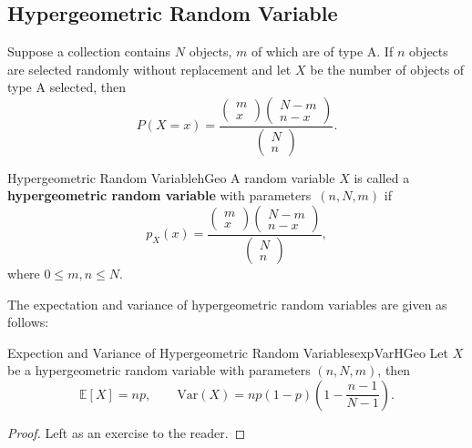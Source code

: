 \documentclass[math]{amznotes}
\theoremstyle{remark}
\newcommand{\0}{\mathbf{0}}
\newcommand{\1}{\mathbf{1}}
\begin{document}
\subsection{Hypergeometric Random Variable}
Suppose a collection contains $N$ objects, $m$ of which are of type A. If $n$ objects are selected randomly without replacement and let $X$ be the number of objects of type A selected, then 
\begin{equation*}
    P(X = x) = \frac{\begin{pmatrix}
        m \\
        x
    \end{pmatrix}\begin{pmatrix}
        N - m\\
        n - x
    \end{pmatrix}}{\begin{pmatrix}
        N \\
        n
    \end{pmatrix}}.
\end{equation*}
\begin{dfnbox}{Hypergeometric Random Variable}{hGeo}
    A random variable $X$ is called a {\color{red} \textbf{hypergeometric random variable}} with parameters~$(n, N, m)$ if
    \begin{equation*}
        p_X(x) = \frac{\begin{pmatrix}
            m \\
            x
        \end{pmatrix}\begin{pmatrix}
            N - m\\
            n - x
        \end{pmatrix}}{\begin{pmatrix}
            N \\
            n
        \end{pmatrix}},
    \end{equation*}
    where $0 \leq m, n \leq N$.
\end{dfnbox}
The expectation and variance of hypergeometric random variables are given as follows:
\begin{thmbox}{\small Expection and Variance of Hypergeometric Random Variables}{expVarHGeo}
    Let $X$ be a hypergeometric random variable with parameters $(n, N, m)$, then
    \begin{equation*}
        \mathbb{E}[X] = np, \qquad \mathrm{Var}(X) = np(1 - p)\left(1 - \frac{n - 1}{N - 1}\right).
    \end{equation*}
    \tcblower
    \begin{proof}
        Left as an exercise to the reader.
    \end{proof}
\end{thmbox}
\end{document}
